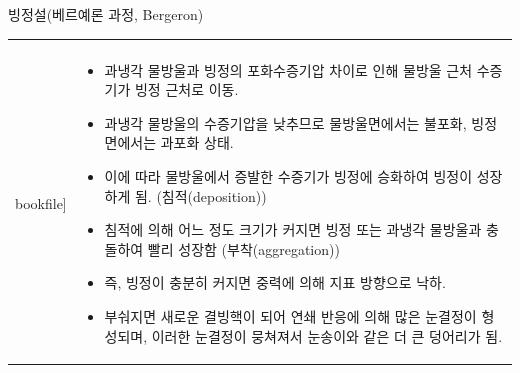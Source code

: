 \begin{frame}[t]{빙정설(베르예론 과정, Bergeron)}
	\begin{tabular}{ll}
		\begin{minipage}[t]{0.4\textwidth}\scriptsize
			\begin{figure}[t]
				\texttt{[image: \\bookfile]}
			\end{figure}
		\end{minipage}	
		&
		\begin{minipage}[t]{0.55\textwidth} \scriptsize
			\begin{itemize}
				\item 과냉각 물방울과 빙정의 포화수증기압 차이로 인해 물방울 근처 수증기가 빙정 근처로 이동. 
				\item 과냉각 물방울의 수증기압을 낮추므로 물방울면에서는 불포화, 빙정면에서는 과포화 상태.
				\item 이에 따라 물방울에서 증발한 수증기가 빙정에 승화하여 빙정이 성장하게 됨. (침적(deposition))
				\item 침적에 의해 어느 정도 크기가 커지면 빙정 또는 과냉각 물방울과 충돌하여 빨리 성장함 (부착(aggregation))
				\item 즉, 빙정이 충분히 커지면 중력에 의해 지표 방향으로 낙하. 
				\item 부숴지면 새로운 결빙핵이 되어 연쇄 반응에 의해 많은 눈결정이 형성되며, 이러한 눈결정이 뭉쳐져서 눈송이와 같은 더 큰 덩어리가 됨.

			\end{itemize}		
			
		\end{minipage}
	\end{tabular}
\end{frame}





